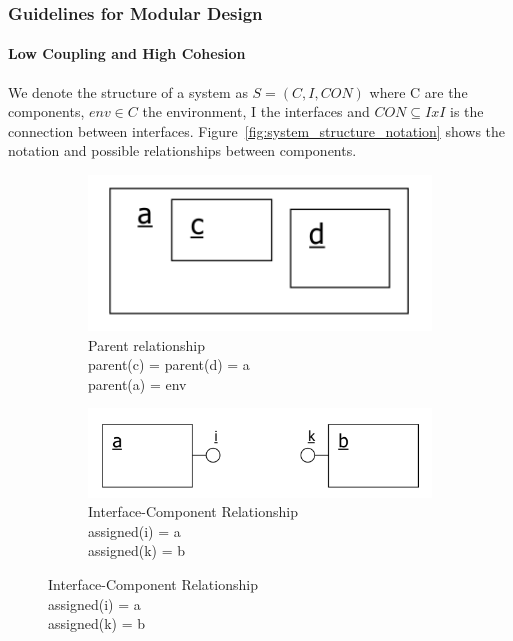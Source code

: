 \subsubsection{Guidelines for Modular Design}
\paragraph{Low Coupling and High Cohesion}
We denote the structure of a system as $S = (C,I,CON)$ where C are the components, $env \in C$ the environment, I the interfaces and $CON \subseteq I x I$ is the connection between interfaces.
Figure~\ref{fig:system_structure_notation} shows the notation and possible relationships between components.
\begin{figure}[h]
  \centering
  \begin{subfigure}{.3\textwidth}
    \centering
    \includegraphics[width=\textwidth]{images/component_parent_relationship.png}
    \caption{Parent relationship\\ parent(c) = parent(d) = a\\ parent(a) = env}
  \end{subfigure}
  \hspace{.03\textwidth}
  \begin{subfigure}{.3\textwidth}
    \centering
    \includegraphics[width=\textwidth]{images/component_interface_relationship.png}
    \caption{Interface-Component Relationship\\ assigned(i) = a\\ assigned(k) = b}
  \end{subfigure}
  \hspace{.03\textwidth}

\end{figure}
